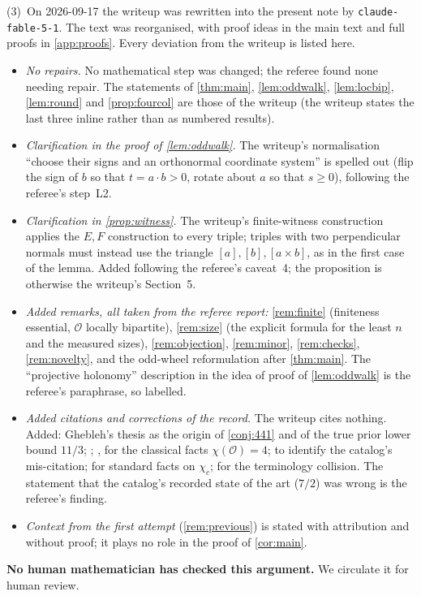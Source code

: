 \documentclass[11pt,a4paper]{article}
\theoremstyle{plain}
\theoremstyle{definition}
\theoremstyle{remark}
\newcommand{\cO}{\mathcal O}
\newcommand{\chic}{\chi_c}
\begin{document}
(3)~On 2026-09-17 the writeup was rewritten into the present note by \texttt{claude-fable-5-1}. The text was reorganised, with proof ideas in the main text and full proofs in \cref{app:proofs}. Every deviation from the writeup is listed here.
\begin{itemize}[nosep]
\item \emph{No repairs.} No mathematical step was changed; the referee found none needing repair. The statements of \cref{thm:main}, \cref{lem:oddwalk}, \cref{lem:locbip}, \cref{lem:round} and \cref{prop:fourcol} are those of the writeup (the writeup states the last three inline rather than as numbered results).
\item \emph{Clarification in the proof of \cref{lem:oddwalk}.} The writeup's normalisation ``choose their signs and an orthonormal coordinate system'' is spelled out (flip the sign of $b$ so that $t=a\cdot b>0$, rotate about $a$ so that $s\ge0$), following the referee's step~L2.
\item \emph{Clarification in \cref{prop:witness}.} The writeup's finite-witness construction applies the $E,F$ construction to every triple; triples with two perpendicular normals must instead use the triangle $[a],[b],[a\times b]$, as in the first case of the lemma. Added following the referee's caveat~4; the proposition is otherwise the writeup's Section~5.
\item \emph{Added remarks, all taken from the referee report:} \cref{rem:finite} (finiteness essential, $\cO$ locally bipartite), \cref{rem:size} (the explicit formula for the least $n$ and the measured sizes), \cref{rem:objection}, \cref{rem:minor}, \cref{rem:checks}, \cref{rem:novelty}, and the odd-wheel reformulation after \cref{thm:main}. The ``projective holonomy'' description in the idea of proof of \cref{lem:oddwalk} is the referee's paraphrase, so labelled.
\item \emph{Added citations and corrections of the record.} The writeup cites nothing. Added: Ghebleh's thesis \cite{Ghebleh07} as the origin of \cref{conj:441} and of the true prior lower bound $11/3$; \cite{DEGGMN07}; \cite{KS67}, \cite{GZ88} for the classical facts $\chi(\cO)=4$; \cite{GN08} to identify the catalog's mis-citation; \cite{Zhu01} for standard facts on $\chic$; \cite{Ill22} for the terminology collision. The statement that the catalog's recorded state of the art ($7/2$) was wrong is the referee's finding.
\item \emph{Context from the first attempt} (\cref{rem:previous}) is stated with attribution and without proof; it plays no role in the proof of \cref{cor:main}.
\end{itemize}
\textbf{No human mathematician has checked this argument.} We circulate it for human review.
\end{document}
